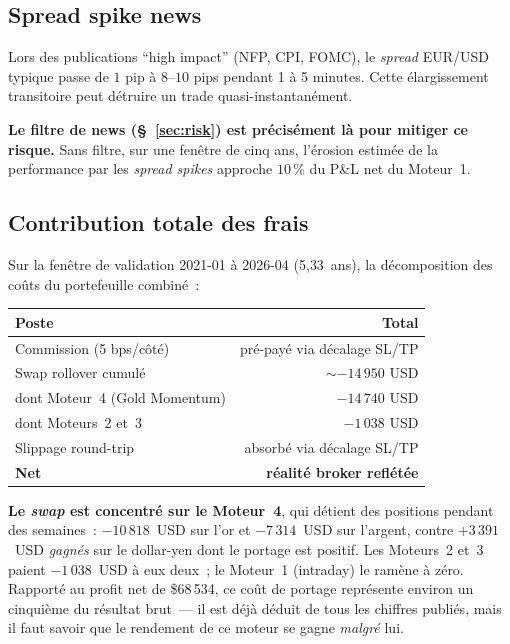 \documentclass[11pt, a4paper]{scrartcl}
\begin{document}
\subsection{Spread spike news}

Lors des publications \enquote{high impact} (NFP, CPI, FOMC), le \emph{spread} EUR/USD typique passe de $1$ pip à $8$--$10$ pips pendant 1 à 5 minutes. Cette élargissement transitoire peut détruire un trade quasi-instantanément.

\begin{warningbox}
\textbf{Le filtre de news (\S~\ref{sec:risk}) est précisément là pour mitiger ce
risque.} Sans filtre, sur une fenêtre de cinq ans, l'érosion estimée de la
performance par les \emph{spread spikes} approche $10\,\%$ du P\&L net du
Moteur~1.
\end{warningbox}

\subsection{Contribution totale des frais}

Sur la fenêtre de validation 2021-01 à 2026-04 (5{,}33~ans), la décomposition des coûts du portefeuille combiné~:

\begin{center}
\renewcommand{\arraystretch}{1.2}
\begin{tabular}{lr}
\toprule
\textbf{Poste} & \textbf{Total} \\
\midrule
Commission (5 bps/côté) & pré-payé via décalage SL/TP \\
Swap rollover cumulé    & $\sim -14\,950$ USD \\
\quad dont Moteur~4 (Gold Momentum) & $-14\,740$ USD \\
\quad dont Moteurs~2 et~3           & $-1\,038$ USD \\
Slippage round-trip     & absorbé via décalage SL/TP \\
\midrule
\textbf{Net} & \textbf{réalité broker reflétée} \\
\bottomrule
\end{tabular}
\end{center}

\textbf{Le \emph{swap} est concentré sur le Moteur~4}, qui détient des positions
pendant des semaines~: $-10\,818$~USD sur l'or et $-7\,314$~USD sur l'argent, contre
$+3\,391$~USD \emph{gagnés} sur le dollar-yen dont le portage est positif. Les
Moteurs~2 et~3 paient $-1\,038$~USD à eux deux~; le Moteur~1 (intraday) le ramène à
zéro. Rapporté au profit net de \$68\,534, ce coût de portage représente environ un
cinquième du résultat brut~--- il est déjà déduit de tous les chiffres publiés, mais
il faut savoir que le rendement de ce moteur se gagne \emph{malgré} lui.
\end{document}

